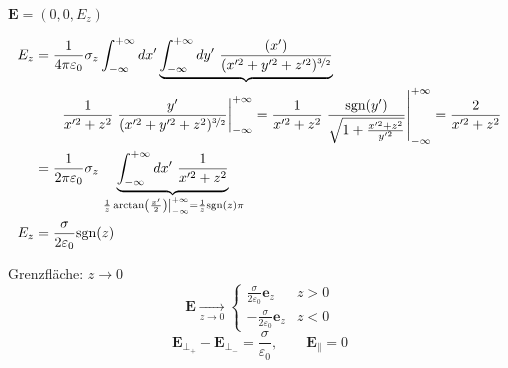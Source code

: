 \documentclass[titlepage,11pt,a4paper,ngerman]{report}
\newcommand{\kq}{\frac{1}{4\pi\epsilon_0}}
\newcommand{\intt}[2]{\int_{#1}^{#2}}
\renewcommand{\vec}[1]{\boldsymbol{#1}}
\renewcommand{\epsilon}{\varepsilon}
\begin{document}
$\vec{E} = (0,0,E_z)$

\begin{align*}
 	E_z &= \kq \sigma_z \intt{-\infty}{+\infty}dx'\underbrace{\intt{-\infty}{+\infty}dy'\ \frac{(x')}{(x'^2 + y'^2 + z'^2)^{\nicefrac{3}{2}}}}\\
 	& \qquad \frac{1}{x'^2 +z^2}\left.\frac{y'}{(x'^2 + y'^2 + z^2)^{\nicefrac{3}{2}}} \right\rvert_{-\infty}^{+\infty} = \frac{1}{x'^2 +z^2}\left.\frac{\textrm{sgn}(y')}{\sqrt{1 + \frac{x'^2 + z^2}{y'^2}}} \right\rvert_{-\infty}^{+\infty} = \frac{2}{x'^2 +z^2}\\
 	&= \frac{1}{2 \pi \epsilon_0} \sigma_z \underbrace{\intt{-\infty}{+\infty} dx'\ \frac{1}{x'^2 + z^2}}_{\left. \frac{1}{z} \arctan \left(\frac{x'}{2}\right)\right\rvert_{-\infty}^{+\infty} = \frac{1}{z} \textrm{sgn}(z)\pi}\\
 	E_z &= \frac{\sigma}{2 \epsilon_0} \textrm{sgn}(z)
\end{align*}
\begin{minipage}{.6\linewidth}
	Grenzfläche: $z \rightarrow 0$
	$$\vec{E} \underset{z \to 0} \longrightarrow \left\{ \begin{array}{cc}
	\frac{\sigma}{2 \epsilon_0} \vec{e}_z & z > 0\\
	-\frac{\sigma}{2 \epsilon_0} \vec{e}_z & z < 0
	\end{array}\right.$$
	$$\vec{E}_{\perp_+} - \vec{E}_{\perp_-} = \frac{\sigma}{\epsilon_0}, \qquad \vec{E}_\parallel = 0$$
\end{minipage}%
\begin{minipage}{.4\linewidth}
	\centering
\end{minipage}%
\end{document}
